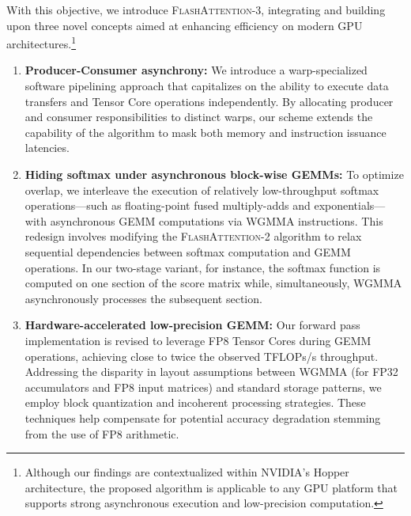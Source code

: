 With this objective, we introduce \textsc{FlashAttention-3}, integrating and building upon three novel concepts aimed at enhancing efficiency on modern GPU architectures.\footnote{Although our findings are contextualized within NVIDIA's Hopper architecture, the proposed algorithm is applicable to any GPU platform that supports strong asynchronous execution and low-precision computation.}

\begin{enumerate}

\item \textbf{Producer-Consumer asynchrony:} We introduce a warp-specialized software pipelining approach that capitalizes on the ability to execute data transfers and Tensor Core operations independently. By allocating producer and consumer responsibilities to distinct warps, our scheme extends the capability of the algorithm to mask both memory and instruction issuance latencies.
\item \textbf{Hiding softmax under asynchronous block-wise GEMMs:} To optimize overlap, we interleave the execution of relatively low-throughput softmax operations—such as floating-point fused multiply-adds and exponentials—with asynchronous GEMM computations via WGMMA instructions. This redesign involves modifying the \textsc{FlashAttention-2} algorithm to relax sequential dependencies between softmax computation and GEMM operations. In our two-stage variant, for instance, the softmax function is computed on one section of the score matrix while, simultaneously, WGMMA asynchronously processes the subsequent section.
\item \textbf{Hardware-accelerated low-precision GEMM:} Our forward pass implementation is revised to leverage FP8 Tensor Cores during GEMM operations, achieving close to twice the observed TFLOPs/s throughput. Addressing the disparity in layout assumptions between WGMMA (for FP32 accumulators and FP8 input matrices) and standard storage patterns, we employ block quantization and incoherent processing strategies. These techniques help compensate for potential accuracy degradation stemming from the use of FP8 arithmetic.
\end{enumerate}

